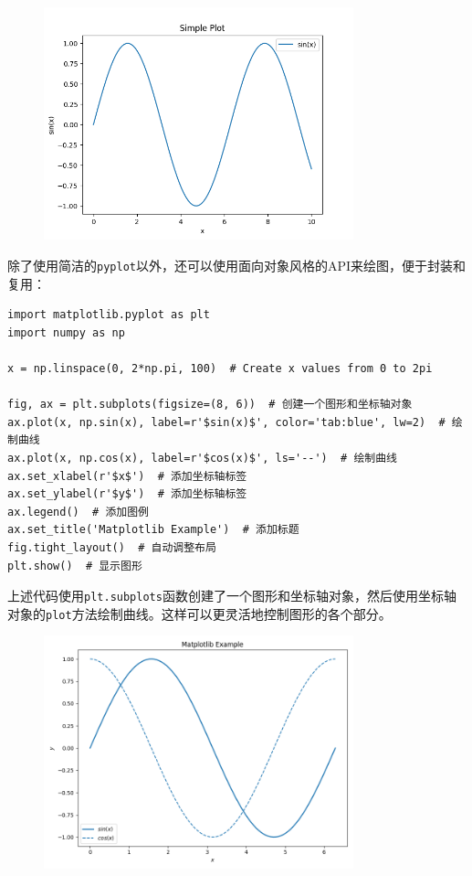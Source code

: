 \documentclass[../main.tex]{subfiles}
\begin{document}
\begin{figure}[htbp]
    \centering
    \includegraphics[width=0.8\textwidth]{images/plt/Figure_1.png}
\end{figure}

除了使用简洁的\texttt{pyplot}以外，还可以使用面向对象风格的API来绘图，便于封装和复用：

\begin{lstlisting}
import matplotlib.pyplot as plt
import numpy as np

x = np.linspace(0, 2*np.pi, 100)  # Create x values from 0 to 2pi

fig, ax = plt.subplots(figsize=(8, 6))  # 创建一个图形和坐标轴对象
ax.plot(x, np.sin(x), label=r'$sin(x)$', color='tab:blue', lw=2)  # 绘制曲线
ax.plot(x, np.cos(x), label=r'$cos(x)$', ls='--')  # 绘制曲线
ax.set_xlabel(r'$x$')  # 添加坐标轴标签
ax.set_ylabel(r'$y$')  # 添加坐标轴标签
ax.legend()  # 添加图例
ax.set_title('Matplotlib Example')  # 添加标题
fig.tight_layout()  # 自动调整布局
plt.show()  # 显示图形
\end{lstlisting}
上述代码使用\texttt{plt.subplots}函数创建了一个图形和坐标轴对象，然后使用坐标轴对象的\texttt{plot}方法绘制曲线。这样可以更灵活地控制图形的各个部分。

\begin{figure}[htbp]
    \centering
    \includegraphics[width=0.8\textwidth]{images/plt/Figure_2.png}
\end{figure}
\end{document}
